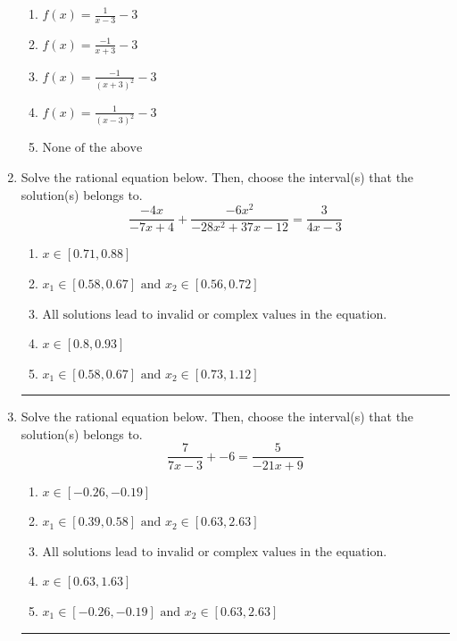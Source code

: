 \documentclass[14pt]{extbook}
\newcommand{\litem}[1]{\item#1\hspace*{-1cm}\rule{\textwidth}{0.4pt}}
\begin{document}
\begin{enumerate}
{\begin{center}
\end{center}
\begin{enumerate}[label=\Alph*.]
\item \( f(x) = \frac{1}{x - 3} - 3 \)
\item \( f(x) = \frac{-1}{x + 3} - 3 \)
\item \( f(x) = \frac{-1}{(x + 3)^2} - 3 \)
\item \( f(x) = \frac{1}{(x - 3)^2} - 3 \)
\item \( \text{None of the above} \)

\end{enumerate} }
\litem{
Solve the rational equation below. Then, choose the interval(s) that the solution(s) belongs to.\[ \frac{-4x}{-7x + 4} + \frac{-6x^{2}}{-28x^{2} +37 x -12} = \frac{3}{4x -3} \]\begin{enumerate}[label=\Alph*.]
\item \( x \in [0.71,0.88] \)
\item \( x_1 \in [0.58, 0.67] \text{ and } x_2 \in [0.56,0.72] \)
\item \( \text{All solutions lead to invalid or complex values in the equation.} \)
\item \( x \in [0.8,0.93] \)
\item \( x_1 \in [0.58, 0.67] \text{ and } x_2 \in [0.73,1.12] \)

\end{enumerate} }
\litem{
Solve the rational equation below. Then, choose the interval(s) that the solution(s) belongs to.\[ \frac{7}{7x -3} + -6 = \frac{5}{-21x + 9} \]\begin{enumerate}[label=\Alph*.]
\item \( x \in [-0.26,-0.19] \)
\item \( x_1 \in [0.39, 0.58] \text{ and } x_2 \in [0.63,2.63] \)
\item \( \text{All solutions lead to invalid or complex values in the equation.} \)
\item \( x \in [0.63,1.63] \)
\item \( x_1 \in [-0.26, -0.19] \text{ and } x_2 \in [0.63,2.63] \)


\end{enumerate}}
\end{enumerate}
\end{document}
